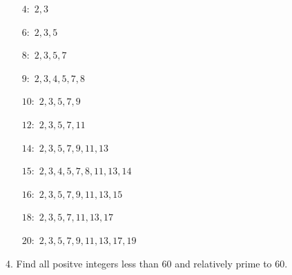 \begin{mdframed}[style=darkAnswer,frametitle={Joe Starr}]
\begin{multicols}{1}
\begin{itemize}
    \item[$4:$]  {$2, 3$}
    \item[$6:$]  {$2, 3, 5$}
    \item[$8:$]  {$2, 3, 5, 7$}
    \item[$9:$]  {$2, 3, 4, 5, 7, 8$}
    \item[$10:$] {$2, 3, 5, 7, 9$}
    \item[$12:$] {$2, 3, 5, 7, 11$}
    \item[$14:$] {$2, 3, 5, 7, 9, 11, 13$}
    \item[$15:$] {$2, 3, 4, 5, 7, 8, 11, 13, 14$}
    \item[$16:$] {$2, 3, 5, 7, 9, 11, 13, 15$}
    \item[$18:$] {$2, 3, 5, 7, 11, 13, 17$}
    \item[$20:$] {$2, 3, 5, 7, 9, 11, 13, 17, 19$}
\end{itemize}
\end{multicols}
\end{mdframed}
\newpage
\begin{mdframed}[style=darkQuesion]
4. Find all positve integers less than 60 and relatively prime to $60$.
\end{mdframed}

